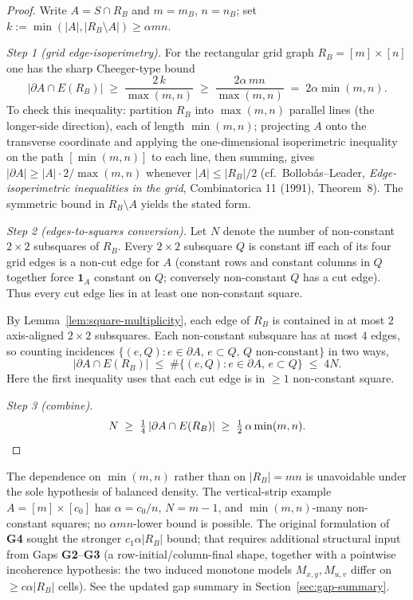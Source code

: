 \begin{proof}
Write $A=S\cap R_B$ and $m=m_B$, $n=n_B$; set $k:=\min(|A|,|R_B\setminus A|)\ge\alpha mn$.

\smallskip
\noindent\emph{Step 1 (grid edge-isoperimetry).} For the rectangular
grid graph $R_B=[m]\times[n]$ one has the sharp Cheeger-type bound
\[
|\partial A\cap E(R_B)|\;\ge\;\frac{2\,k}{\max(m,n)}
\;\ge\;\frac{2\alpha\,mn}{\max(m,n)}\;=\;2\alpha\min(m,n).
\]
To check this inequality: partition $R_B$ into $\max(m,n)$ parallel lines
(the longer-side direction), each of length $\min(m,n)$; projecting $A$
onto the transverse coordinate and applying the one-dimensional isoperimetric
inequality on the path $[\min(m,n)]$ to each line, then summing, gives
$|\partial A|\ge|A|\cdot 2/\max(m,n)$ whenever $|A|\le|R_B|/2$ (cf.\ Bollob\'as--Leader,
\emph{Edge-isoperimetric inequalities in the grid}, Combinatorica 11 (1991),
Theorem~8). The symmetric bound in $R_B\setminus A$ yields the stated form.

\smallskip
\noindent\emph{Step 2 (edges-to-squares conversion).} Let $N$ denote
the number of non-constant $2\times2$ subsquares of $R_B$. Every
$2\times2$ subsquare $Q$ is constant iff each of its four grid edges is
a non-cut edge for $A$ (constant rows and constant columns in $Q$
together force $\mathbf 1_A$ constant on $Q$; conversely non-constant
$Q$ has a cut edge). Thus every cut edge lies in at least one non-constant
square.

By Lemma~\ref{lem:square-multiplicity}, each edge of $R_B$ is contained
in at most $2$ axis-aligned $2\times2$ subsquares. Each non-constant
subsquare has at most $4$ edges, so counting incidences
$\{(e,Q):e\in\partial A,\,e\subset Q,\,Q\text{ non-constant}\}$ in two
ways,
\[
|\partial A\cap E(R_B)|
\;\le\;\#\bigl\{(e,Q):e\in\partial A,\,e\subset Q\bigr\}
\;\le\;4N.
\]
Here the first inequality uses that each cut edge is in $\ge 1$
non-constant square.

\smallskip
\noindent\emph{Step 3 (combine).}
\[
N\;\ge\;\tfrac14\,|\partial A\cap E(R_B)|\;\ge\;\tfrac{1}{2}\,\alpha\min(m,n). \qedhere
\]
\end{proof}

\begin{remark}
\label{rem:many-nonconst-sharp}
The dependence on $\min(m,n)$ rather than on $|R_B|=mn$ is unavoidable
under the sole hypothesis of balanced density. The vertical-strip example
$A=[m]\times[c_0]$ has $\alpha=c_0/n$, $N=m-1$, and $\min(m,n)$-many non-constant
squares; no $\alpha mn$-lower bound is possible. The original formulation
of \textbf{G4} sought the stronger $c_1\alpha|R_B|$ bound; that requires
additional structural input from Gaps \textbf{G2}--\textbf{G3} (a
row-initial/column-final shape, together with a pointwise incoherence
hypothesis: the two induced monotone models $M_{x,y},M_{u,v}$ differ on
$\ge c\alpha|R_B|$ cells). See the updated gap summary in
Section~\ref{sec:gap-summary}.
\end{remark}


